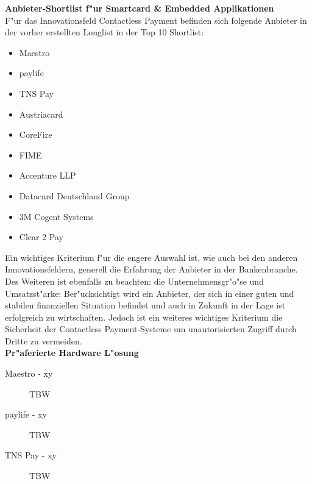 \textbf{Anbieter-Shortlist f"ur Smartcard \& Embedded Applikationen}\\
F"ur das Innovationsfeld Contactless Payment befinden sich folgende Anbieter in der vorher erstellten Longlist in der Top 10 Shortlist:

\begin{itemize}
	\item Maestro
	\item paylife
	\item TNS Pay
	\item Austriacard
	\item CoreFire
	\item FIME
	\item Accenture LLP
	\item Datacard Deutschland Group
	\item 3M Cogent Systems
	\item Clear 2 Pay
\end{itemize}

Ein wichtiges Kriterium f"ur die engere Auswahl ist, wie auch bei den anderen Innovationsfeldern, generell die Erfahrung der Anbieter in der Bankenbranche. Des Weiteren ist ebenfalls zu beachten: die Unternehmensgr"o"se und Umsatzst"arke: Ber"ucksichtigt wird ein Anbieter, der sich in einer guten und stabilen finanziellen Situation befindet und auch in Zukunft in der Lage ist erfolgreich zu wirtschaften. Jedoch ist ein weiteres wichtiges Kriterium die Sicherheit der Contactless Payment-Systeme um unautorisierten Zugriff durch Dritte zu vermeiden. \\

\textbf{Pr"aferierte Hardware L"osung}

\begin{description}
	
	\item[Maestro - xy] TBW
	
	\item[paylife - xy] TBW

	\item[TNS Pay - xy] TBW

\end{description}